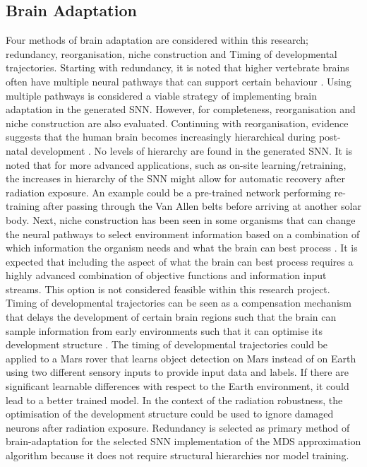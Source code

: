 \subsection{Brain Adaptation}\label{subsec:brain_adaptation}
Four methods of brain adaptation are considered within this research; redundancy, reorganisation, niche construction and Timing of developmental trajectories.  Starting with redundancy, it is noted that higher vertebrate brains often have multiple neural pathways that can support certain behaviour \cite{johnson_brain_2015}. Using multiple pathways is considered a viable strategy of implementing brain adaptation in the generated SNN. However, for completeness, reorganisation and niche construction are also evaluated. Continuing with reorganisation, evidence suggests that the human brain becomes increasingly hierarchical during post-natal development \cite{supekar_brain_2013}. No levels of hierarchy are found in the generated SNN. It is noted that for more advanced applications, such as on-site learning/retraining, the increases in hierarchy of the SNN might allow for automatic recovery after radiation exposure. An example could be a pre-trained network performing re-training after passing through the Van Allen belts before arriving at another solar body. Next, niche construction has been seen in some organisms that can change the neural pathways to select environment information based on a combination of which information the organism needs and what the brain can best process \cite{johnson_brain_2015}. It is expected that including the aspect of what the brain can best process requires a highly advanced combination of objective functions and information input streams. This option is not considered feasible within this research project. Timing of developmental trajectories can be seen as a compensation mechanism that delays the development of certain brain regions such that the brain can sample information from early environments such that it can optimise its development structure \cite{johnson_brain_2015}. The timing of developmental trajectories could be applied to a Mars rover that learns object detection on Mars instead of on Earth using two different sensory inputs to provide input data and labels. If there are significant learnable differences with respect to the Earth environment, it could lead to a better trained model. In the context of the radiation robustness, the optimisation of the development structure could be used to ignore damaged neurons after radiation exposure. Redundancy is selected as primary method of brain-adaptation for the selected SNN implementation of the MDS approximation algorithm because it does not require structural hierarchies nor model training.

